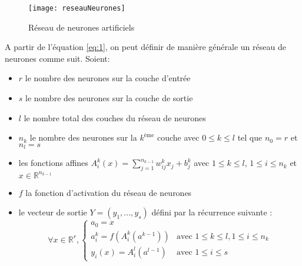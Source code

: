         \begin{figure}
            \centering
            \texttt{[image: reseauNeurones]}
            \caption{Réseau de neurones artificiels}
        \end{figure}
    A partir de l'équation \ref{eq:1}, on peut définir de manière générale un réseau de neurones comme suit.
    Soient:
        \begin{itemize}
            \item $r$ le nombre des neurones sur la couche d’entrée
            \item $s$ le nombre des neurones sur la couche de sortie
            \item $l$ le nombre total des couches du réseau de neurones
            \item $n_k$ le nombre des neurones sur la $k^\text{ème}$ couche avec $0 \leq k \leq l$ tel que $n_0 = r$ et $n_l = s$
            \item les fonctions affines $A_{i}^{k}(x) = \sum_{j = 1}^{n_{k-1}}w_{ij}^{k}x_{j} + b_{j}^{k}$ avec $1 \leq k \leq l$, $1 \leq i \leq n_k$ et $x \in \mathbb{R}^{n_{k-1}}$
            \item $f$ la fonction d’activation du réseau de neurones
            \item le vecteur de sortie $Y = (y_1, ..., y_s)$ défini par la récurrence suivante : 
            \begin{equation}
                \forall x \in \mathbb{R}^{r}, 
                \begin{cases} 
                    a_{0} = x   \\
                    a_{i}^{k} = f(A_{i}^{k}(a^{k-1}))      & \text{avec } 1 \leq k \leq l, 1 \leq i \leq n_k \\
                    y_{i}(x) = A_{i}^{l}(a^{l-1}) & \text{avec } 1 \leq i \leq s
                \end{cases}
            \end{equation}\cite{dahmaneThesis}
        \end{itemize}

